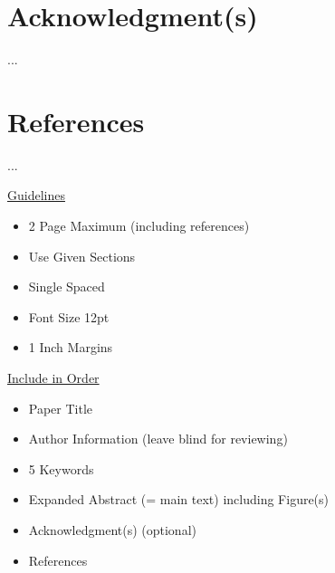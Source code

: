 \documentclass[a4paper,12pt]{article}
\begin{document}
\section*{Acknowledgment(s)} %
...


\section*{References}
...


\vskip 40pt
\underline {Guidelines}
\begin{itemize}
\itemsep0pt
  \item 2 Page Maximum (including references)
  \item Use Given Sections
  \item Single Spaced
  \item Font Size 12pt
  \item 1 Inch Margins
  \end{itemize}

\underline {Include in Order}
\begin{itemize}
\itemsep0pt
  \item Paper Title
  \item Author Information (leave blind for reviewing)
  \item 5 Keywords
  \item Expanded Abstract (= main text)  including Figure(s)
  \item Acknowledgment(s) (optional)
  \item References
\end{itemize}
\end{document}
